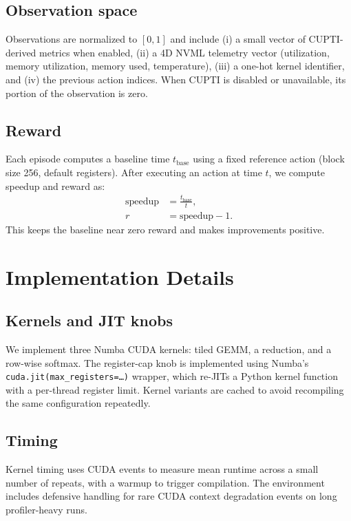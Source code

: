 \documentclass[journal,letterpaper]{IEEEtran}
\begin{document}
\subsection{Observation space}
Observations are normalized to $[0,1]$ and include (i) a small vector of CUPTI-derived metrics when enabled, (ii) a 4D NVML telemetry vector (utilization, memory utilization, memory used, temperature), (iii) a one-hot kernel identifier, and (iv) the previous action indices.
When CUPTI is disabled or unavailable, its portion of the observation is zero.

\subsection{Reward}
Each episode computes a baseline time $t_{\text{base}}$ using a fixed reference action (block size 256, default registers).
After executing an action at time $t$, we compute speedup and reward as:
\begin{align}
  \text{speedup} &= \frac{t_{\text{base}}}{t},\\
  r &= \text{speedup} - 1.
\end{align}
This keeps the baseline near zero reward and makes improvements positive.

\section{Implementation Details}
\label{sec:impl}

\subsection{Kernels and JIT knobs}
We implement three Numba CUDA kernels: tiled GEMM, a reduction, and a row-wise softmax.
The register-cap knob is implemented using Numba's \texttt{cuda.jit(max\_registers=\dots)} wrapper, which re-JITs a Python kernel function with a per-thread register limit.
Kernel variants are cached to avoid recompiling the same configuration repeatedly.

\subsection{Timing}
Kernel timing uses CUDA events to measure mean runtime across a small number of repeats, with a warmup to trigger compilation.
The environment includes defensive handling for rare CUDA context degradation events on long profiler-heavy runs.
\end{document}
